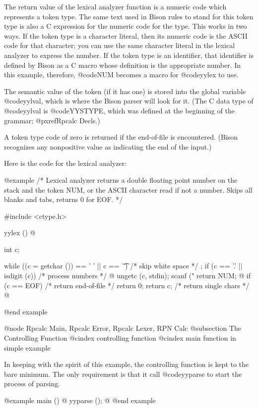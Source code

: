{{{The return value of the lexical analyzer function is a numeric code which
represents a token type.  The same text used in Bison rules to stand for
this token type is also a C expression for the numeric code for the type.
This works in two ways.  If the token type is a character literal, then its
numeric code is the ASCII code for that character; you can use the same
character literal in the lexical analyzer to express the number.  If the
token type is an identifier, that identifier is defined by Bison as a C
macro whose definition is the appropriate number.  In this example,
therefore, @code{NUM} becomes a macro for @code{yylex} to use.

The semantic value of the token (if it has one) is stored into the global
variable @code{yylval}, which is where the Bison parser will look for it.
(The C data type of @code{yylval} is @code{YYSTYPE}, which was defined
at the beginning of the grammar; @pxref{Rpcalc Decls}.)

A token type code of zero is returned if the end-of-file is encountered.
(Bison recognizes any nonpositive value as indicating the end of the
input.)

Here is the code for the lexical analyzer:

@example
/* Lexical analyzer returns a double floating point number on the
   stack and the token NUM, or the ASCII character read if not a
   number.  Skips all blanks and tabs, returns 0 for EOF. */

#include <ctype.h>

yylex ()
@{
  int c;

  while ((c = getchar ()) == ' ' || c == '\t')  /* skip white space  */
    ;
  if (c == '.' || isdigit (c))                /* process numbers   */
    @{
      ungetc (c, stdin);
      scanf ("%
      return NUM;
    @}
  if (c == EOF)                            /* return end-of-file  */
    return 0;
  return c;                                /* return single chars */
@}
@end example

@node Rpcalc Main, Rpcalc Error, Rpcalc Lexer, RPN Calc
@subsection The Controlling Function
@cindex controlling function
@cindex main function in simple example

In keeping with the spirit of this example, the controlling function is
kept to the bare minimum.  The only requirement is that it call
@code{yyparse} to start the process of parsing.

@example
main ()
@{
  yyparse ();
@}
@end example

}}}
